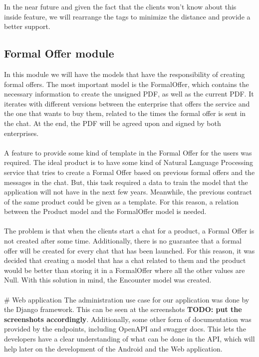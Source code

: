\documentclass[./main.tex]{subfiles}
\begin{document}
In the near future and given the fact that the clients won't know about
this inside feature, we will rearrange the tags to minimize the distance
and provide a better support.


\subsection{Formal Offer module}

In this module we will have the models that have the responsibility of
creating formal offers. The most important model is the FormalOffer,
which contains the necessary information to create the unsigned PDF, as
well as the current PDF. It iterates with different versions between the
enterprise that offers the service and the one that wants to buy them,
related to the times the formal offer is sent in the chat. At the end,
the PDF will be agreed upon and signed by both enterprises.
\\
\\

A feature to provide some kind of template in the Formal Offer for the
users was required. The ideal product is to have some kind of Natural
Language Processing service that tries to create a Formal Offer based on
previous formal offers and the messages in the chat. But, this task
required a data to train the model that the application will not have in
the next few years. Meanwhile, the previous contract of the same product
could be given as a template. For this reason, a relation between the
Product model and the FormalOffer model is needed.
\\
\\

The problem is that when the clients start a chat for a product, a
Formal Offer is not created after some time. Additionally, there is no
guarantee that a formal offer will be created for every chat that has
been launched. For this reason, it was decided that creating a model
that has a chat related to them and the product would be better than
storing it in a FormalOffer where all the other values are Null. With
this solution in mind, the Encounter model was created.
\\
\\

\# Web application The administration use case for our application was
done by the Django framework. This can be seen at the screenshots
\textbf{TODO: put the screenshots accordingly}. Additionally, some other
form of documentation was provided by the endpoints, including OpenAPI
and swagger docs. This lets the developers have a clear understanding of
what can be done in the API, which will help later on the development of
the Android and the Web application.
\\
\\
\end{document}
